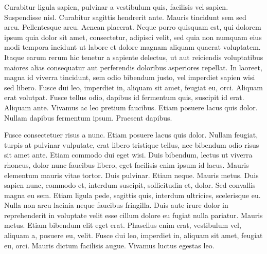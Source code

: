 \documentclass[]{article}
\begin{document}
\begin{multicols}{3}
\para
Curabitur ligula sapien, pulvinar a vestibulum quis, facilisis vel
sapien. Suspendisse nisl. Curabitur sagittis hendrerit ante. Mauris
tincidunt sem sed arcu. Pellentesque arcu. Aenean placerat. Neque porro
quisquam est, qui dolorem ipsum quia dolor sit amet, consectetur,
adipisci velit, sed quia non numquam eius modi tempora incidunt ut
labore et dolore magnam aliquam quaerat voluptatem. Itaque earum rerum
hic tenetur a sapiente delectus, ut aut reiciendis voluptatibus maiores
alias consequatur aut perferendis doloribus asperiores repellat. In
laoreet, magna id viverra tincidunt, sem odio bibendum justo, vel
imperdiet sapien wisi sed libero. Fusce dui leo, imperdiet in, aliquam
sit amet, feugiat eu, orci. Aliquam erat volutpat. Fusce tellus odio,
dapibus id fermentum quis, suscipit id erat. Aliquam ante. Vivamus ac
leo pretium faucibus. Etiam posuere lacus quis dolor. Nullam dapibus
fermentum ipsum. Praesent dapibus.


\para
Fusce consectetuer risus a nunc. Etiam posuere lacus quis dolor. Nullam
feugiat, turpis at pulvinar vulputate, erat libero tristique tellus, nec
bibendum odio risus sit amet ante. Etiam commodo dui eget wisi. Duis
bibendum, lectus ut viverra rhoncus, dolor nunc faucibus libero, eget
facilisis enim ipsum id lacus. Mauris elementum mauris vitae
tortor. Duis pulvinar. Etiam neque. Mauris metus. Duis sapien nunc,
commodo et, interdum suscipit, sollicitudin et, dolor. Sed convallis
magna eu sem. Etiam ligula pede, sagittis quis, interdum ultricies,
scelerisque eu. Nulla non arcu lacinia neque faucibus fringilla. Duis
aute irure dolor in reprehenderit in voluptate velit esse cillum dolore
eu fugiat nulla pariatur. Mauris metus. Etiam bibendum elit eget
erat. Phasellus enim erat, vestibulum vel, aliquam a, posuere eu,
velit. Fusce dui leo, imperdiet in, aliquam sit amet, feugiat eu,
orci. Mauris dictum facilisis augue. Vivamus luctus egestas leo.


\end{multicols}
\end{document}
